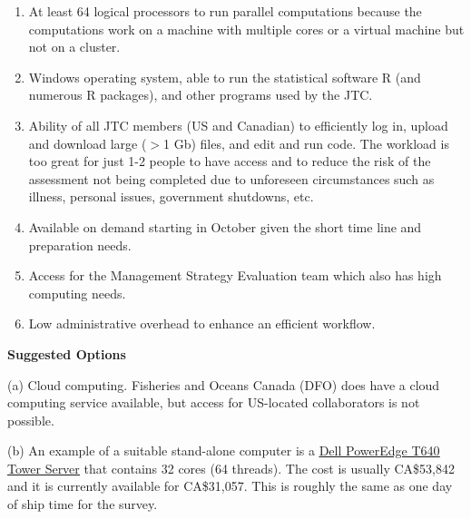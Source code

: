 \documentclass[12pt]{book}\usepackage[]{graphicx}\usepackage[]{color}
\begin{document}
\begin{enumerate}

  \item At least 64 logical processors to run parallel computations because the
    computations work on a machine with multiple cores or a virtual
    machine but not on a cluster.

  \item Windows operating system, able to run the statistical software R (and
    numerous R packages), and other programs used by the JTC.

  \item Ability of all JTC members (US and Canadian) to efficiently log in,
    upload and download large ($>$1 Gb) files, and edit and run code.
    The workload is too great for just 1-2 people to have access
    and to reduce the risk of the
    assessment not being completed due to unforeseen circumstances
    such as illness, personal issues, government shutdowns, etc.

  \item Available on demand starting in October given
    the short time line and preparation needs.

  \item Access for the Management Strategy Evaluation team which also
    has high computing needs.

  \item Low administrative overhead to enhance an efficient workflow.

\end{enumerate}

{\bf Suggested Options}

(a) Cloud computing. Fisheries and Oceans Canada (DFO) does have a cloud
computing service available, but access for US-located collaborators is not possible.

(b) An example of a suitable stand-alone computer is a
\href{http://bit.ly/hake-power-computer}{\underline{Dell PowerEdge T640 Tower Server}}
that contains 32 cores (64 threads). The cost is usually CA\$53,842 and it is
currently available for CA\$31,057. This is roughly the same as one day of ship
time for the survey.



\end{document}
